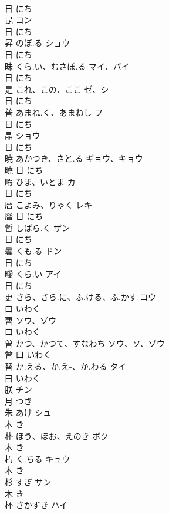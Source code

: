 \documentclass[8pt]{extreport}
\begin{document}
\begin{CJK}{UTF8}{min}
\\	日		にち		
\\	昆		コン	
\\	日		にち		
\\	昇	のぼ.る	ショウ	
\\	日		にち		
\\	昧	くら.い、むさぼ.る	マイ、バイ	
\\	日		にち		
\\	是	これ、この、ここ	ゼ、シ	
\\	日		にち		
\\	普	あまね.く、あまねし	フ	
\\	日		にち		
\\	晶		ショウ	
\\	日		にち		
\\	暁	あかつき、さと.る	ギョウ、キョウ	
\\	曉	日		にち		
\\	暇	ひま、いとま	カ	
\\	日		にち		
\\	暦	こよみ、りゃく	レキ	
\\	曆	日		にち		
\\	暫	しばら.く	ザン	
\\	日		にち		
\\	曇	くも.る	ドン	
\\	日		にち		
\\	曖	くら.い	アイ	
\\	日		にち		
\\	更	さら、さら.に、ふ.ける、ふ.かす	コウ	
\\	曰		いわく		
\\	曹		ソウ、ゾウ	
\\	曰		いわく		
\\	曽	かつ、かつて、すなわち	ソウ、ソ、ゾウ	
\\	曾	曰		いわく		
\\	替	か.える、か.え-、か.わる	タイ	
\\	曰		いわく		
\\	朕		チン	
\\	月		つき		
\\	朱	あけ	シュ	
\\	木		き		
\\	朴	ほう、ほお、えのき	ボク	
\\	木		き		
\\	朽	く.ちる	キュウ	
\\	木		き		
\\	杉	すぎ	サン	
\\	木		き		
\\	杯	さかずき	ハイ	

\end{CJK}
\end{document}
